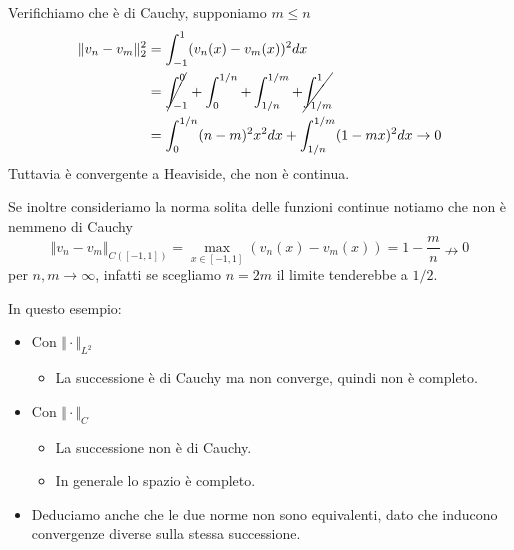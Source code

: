\documentclass[10pt,a4paper,twoside,openright]{book}
\begin{document}
\begin{itemize}
\begin{figure}[htpb]
\end{figure}
\FloatBarrier

Verifichiamo che è di Cauchy, supponiamo $\displaystyle m\leqslant n$\begin{align*}
\Vert v_{n} -v_{m}\Vert _{2}^{2} & =\int _{-1}^{1}( v_{n}( x) -v_{m}( x))^{2} dx\\
 & =\cancel{\int _{-1}^{0}} +\int _{0}^{1/n} +\int _{1/n}^{1/m} +\cancel{\int _{1/m}^{1}}\\
 & =\int _{0}^{1/n}( n-m)^{2} x^{2} dx+\int _{1/n}^{1/m}( 1-mx)^{2} dx\rightarrow 0
\end{align*}Tuttavia è convergente a Heaviside, che non è continua.

Se inoltre consideriamo la norma solita delle funzioni continue notiamo che non è nemmeno di Cauchy\begin{equation*}
\Vert v_{n} -v_{m}\Vert _{C([ -1,1])} =\max_{x\in [ -1,1]}( v_{n}( x) -v_{m}( x)) =1-\frac{m}{n} \nrightarrow 0
\end{equation*}per $n,m\rightarrow \infty $, infatti se scegliamo $\displaystyle n=2m$ il limite tenderebbe a $\displaystyle 1/2$.
\end{itemize}

In questo esempio:
\begin{itemize}
	\item Con $\displaystyle \Vert \cdotp \Vert _{L^{2}}$
	\begin{itemize}
		\item La successione è di Cauchy ma non converge, quindi non è completo.
	\end{itemize}
	\item Con $\Vert \cdotp \Vert _{C}$
	\begin{itemize}
		\item La successione non è di Cauchy.
		\item In generale lo spazio è completo.
	\end{itemize}
	\item Deduciamo anche che le due norme non sono equivalenti, dato che inducono convergenze diverse sulla stessa successione.
\end{itemize}
\end{document}
